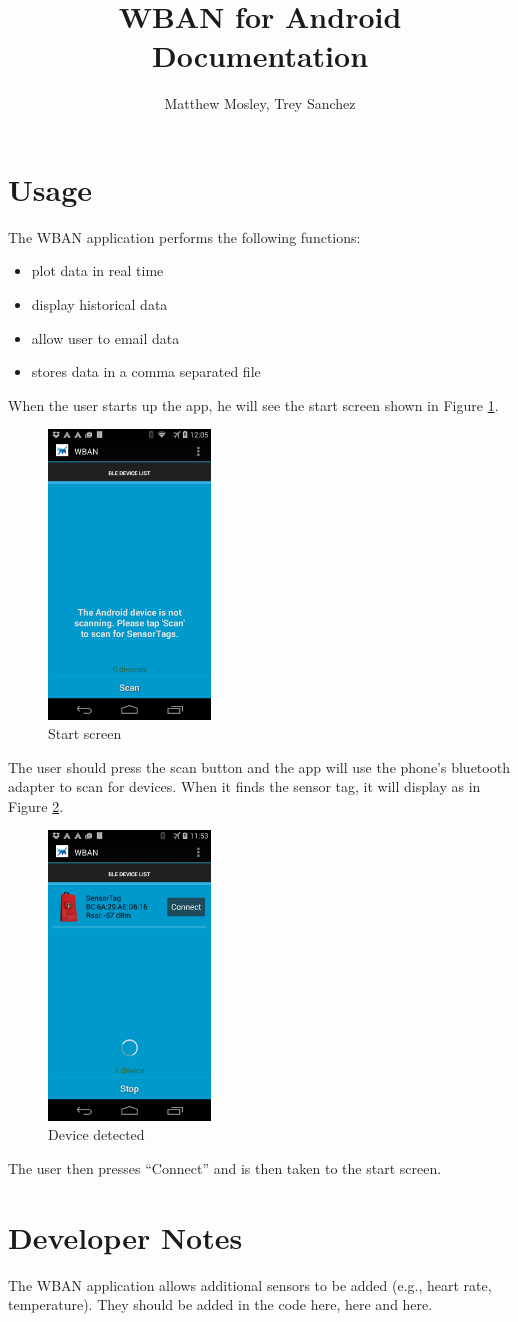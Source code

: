 \documentclass{article}
\author{Matthew Mosley, Trey Sanchez}
\title{WBAN for Android Documentation}
\begin{document}
\maketitle

\section{Usage}
The WBAN application performs the following functions:

\begin{itemize}
\item plot data in real time
\item display historical data
\item allow user to email data
\item stores data in a comma separated file
\end{itemize}

When the user starts up the app, he will see the start screen shown in Figure \ref{fig:start}.
\begin{figure}[!h]
\label{fig:start}
  \centering
  \includegraphics[width=1.7in]{pics/start.png}
  \caption{Start screen}
\end{figure}

The user should press the scan button and the app will use the phone's bluetooth adapter to scan for devices. When
it finds the sensor tag, it will display as in Figure \ref{fig:scan}.

\begin{figure}[!h]
  \centering
  \includegraphics[width=1.7in]{pics/scan.png}
  \caption{Device detected}
  \label{fig:scan}
\end{figure}

The user then presses ``Connect'' and is then taken to the start screen.


\section{Developer Notes}
The WBAN application allows additional sensors to be added (e.g., heart rate, temperature). They should be added in
the code here, here and here.
\end{document}
